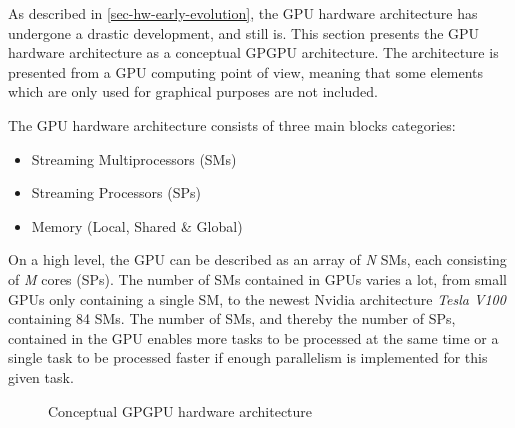 As described in \cref{sec-hw-early-evolution}, the GPU hardware architecture has undergone a drastic development, and still is.
This section presents the GPU hardware architecture as a conceptual GPGPU architecture.
The architecture is presented from a GPU computing point of view, meaning that some elements which are only used for graphical purposes are not included.


The GPU hardware architecture consists of three main blocks categories:
\begin{itemize}
	\item Streaming Multiprocessors (SMs)
	\item Streaming Processors (SPs) 
	\item Memory (Local, Shared \& Global)
\end{itemize}

On a high level, the GPU can be described as an array of \textit{N} SMs, each consisting of \textit{M} cores (SPs). 
The number of SMs contained in GPUs varies a lot, from small GPUs only containing a single SM, to the newest Nvidia architecture \textit{Tesla V100} containing 84 SMs.
The number of SMs, and thereby the number of SPs, contained in the GPU enables more tasks to be processed at the same time or a single task to be processed faster if enough parallelism is implemented for this given task. 



\begin{figure}[ht]
	\centering
	\caption{Conceptual GPGPU hardware architecture}
	\label{fig:hw-gpu}
\end{figure}